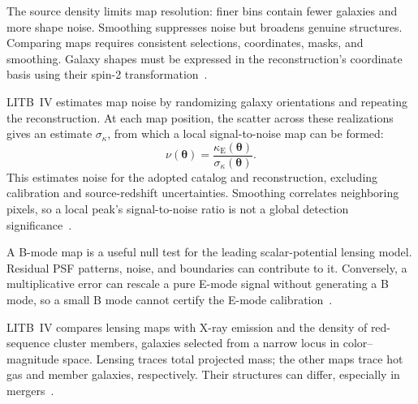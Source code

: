 The source density limits map resolution: finer bins contain fewer galaxies and more shape noise. Smoothing suppresses noise but broadens genuine structures. Comparing maps requires consistent selections, coordinates, masks, and smoothing. Galaxy shapes must be expressed in the reconstruction's coordinate basis using their spin-2 transformation~\cite{schneider_weak_2006}.

LITB~IV estimates map noise by randomizing galaxy orientations and repeating the reconstruction. At each map position, the scatter across these realizations gives an estimate $\sigma_\kappa$, from which a local signal-to-noise map can be formed:
\begin{equation}
    \nu(\boldsymbol{\theta})=
    \frac{\kappa_{\mathrm{E}}(\boldsymbol{\theta})}{\sigma_\kappa(\boldsymbol{\theta})}.
    \label{eq:map-snr}
\end{equation}
This estimates noise for the adopted catalog and reconstruction, excluding calibration and source-redshift uncertainties. Smoothing correlates neighboring pixels, so a local peak's signal-to-noise ratio is not a global detection significance~\cite{saha_lensing_2026,schneider_weak_2006}.

A B-mode map is a useful null test for the leading scalar-potential lensing model. Residual PSF patterns, noise, and boundaries can contribute to it. Conversely, a multiplicative error can rescale a pure E-mode signal without generating a B mode, so a small B mode cannot certify the E-mode calibration~\cite{schneider_weak_2006,mandelbaum_weak_2018}.

LITB~IV compares lensing maps with X-ray emission and the density of red-sequence cluster members, galaxies selected from a narrow locus in color--magnitude space. Lensing traces total projected mass; the other maps trace hot gas and member galaxies, respectively. Their structures can differ, especially in mergers~\cite{saha_lensing_2026}.
